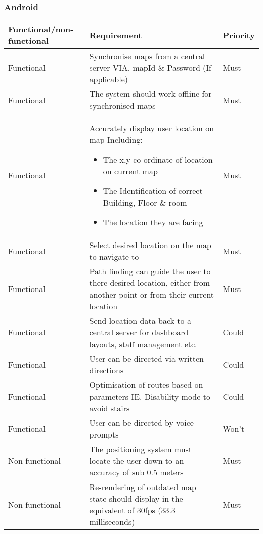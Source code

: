 {\subsubsection{Android}
{\renewcommand{\arraystretch}{1.5}%
\begin{tabular}{| p{} | p{} | p{}|}
	\hline
	Functional/non-functional & Requirement & Priority\\\hline
	Functional & Synchronise maps from a central server VIA, mapId \& Password (If applicable)& Must\\\hline
	Functional & The system should work offline for synchronised maps & Must\\\hline
	Functional & 
		Accurately display user location on map Including:
			\begin{itemize}
				\item The x,y co-ordinate of location on current map
				\item The Identification of correct Building, Floor \& room
				\item The location they are facing
			\end{itemize}
	 & Must\\\hline
	Functional & Select desired location on the map to navigate to & Must\\\hline
	Functional & Path finding can guide the user to there desired location, either from another point or from their current location & Must\\\hline
	Functional & Send location data back to a central server for dashboard layouts, staff management etc. & Could\\\hline
	Functional & User can be directed via written directions & Could\\\hline
	Functional & Optimisation of routes based on parameters IE. Disability mode to avoid stairs & Could\\\hline
	Functional & User can be directed by voice prompts & Won't\\\hline
	Non functional & The positioning system must locate the user down to an accuracy of sub 0.5 meters & Must\\\hline
	Non functional & Re-rendering of outdated map state should display in the equivalent of 30fps (33.3 milliseconds) & Must\\\hline

\end{tabular}


}}
